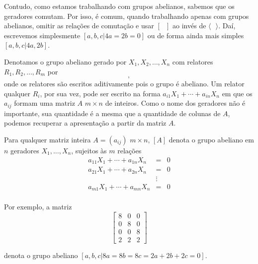    	\par\vspace{0.3cm} Contudo, como estamos trabalhando com grupos abelianos, sabemos que os geradores
    	comutam. Por isso, é comum, quando trabalhando apenas com grupos abelianos, omitir as relações de
    	comutação e usar $[ \text{ } ]$ ao invés de $\langle \text{ } \rangle$. Daí, escrevemos simplesmente
    	$[a,b,c\vert 4a=2b=0]$ ou de forma ainda mais simples $[a,b,c|4a,2b]$.
    	
    	\par\vspace{0.3cm} Denotamos o grupo abeliano gerado por $X_1, X_2, \dots, X_n$ com relatores 
    	$R_1, R_2, \dots, R_m$ por 
    	\begin{equation*}
    	    [X_1, X_2, \dots, X_n\vert R_1, R_2, \dots, R_m],
    	\end{equation*}
    	onde os relatores são escritos aditivamente pois o grupo é abeliano. Um relator qualquer $R_i$, 
    	por sua vez, pode ser escrito na forma $a_{i1}X_1+ \cdots +a_{in}X_n$ em que os $a_{ij}$ formam 
    	uma matriz $A$ $m\times n$ de inteiros. Como o nome dos geradores não é importante, sua quantidade 
    	é a mesma que a quantidade de colunas de $A$, podemos recuperar a apresentação a partir da matriz $A$.
    	
    	\par\vspace{0.3cm} Para qualquer matriz inteira $A=(a_{ij})$ $m\times n$, $[A]$ denota o grupo 
    	abeliano em $n$ geradores $X_1, \dots, X_n$, sujeitos às $m$ relações
    	\begin{equation*}
        	\begin{array}{ccc}
            	a_{11}X_1 +  \cdots  + a_{1n}X_n & = & 0 \\
            	a_{21}X_1 +  \cdots  + a_{2n}X_n & = & 0 \\
            	& \vdots &  \\
            	a_{m1}X_1 +  \cdots  + a_{mn}X_n & = & 0 \\
        	\end{array} 	
    	\end{equation*}
    	\par\vspace{0.3cm} Por exemplo, a matriz 
    	$$ \begin{bmatrix}
    	8 & 0 & 0 \\
    	0 & 8 & 0 \\
    	0 & 0 & 8 \\
    	2 & 2 & 2
    	\end{bmatrix} $$
    	\par\vspace{0.3cm} denota o grupo abeliano $[ a,b,c \vert 8a=8b=8c=2a+2b+2c=0 ]$.
    	
